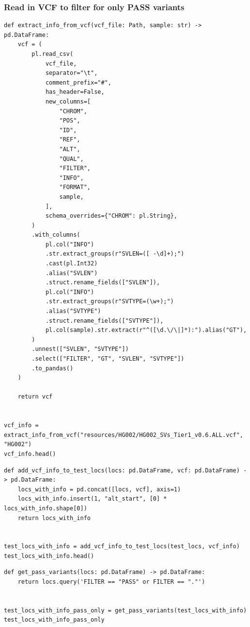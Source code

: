 \documentclass{article}
\begin{document}
\subsubsection{Read in VCF to filter for only PASS variants}

\begin{verbatim}
def extract_info_from_vcf(vcf_file: Path, sample: str) -> pd.DataFrame:
    vcf = (
        pl.read_csv(
            vcf_file,
            separator="\t",
            comment_prefix="#",
            has_header=False,
            new_columns=[
                "CHROM",
                "POS",
                "ID",
                "REF",
                "ALT",
                "QUAL",
                "FILTER",
                "INFO",
                "FORMAT",
                sample,
            ],
            schema_overrides={"CHROM": pl.String},
        )
        .with_columns(
            pl.col("INFO")
            .str.extract_groups(r"SVLEN=([ -\d]+);")
            .cast(pl.Int32)
            .alias("SVLEN")
            .struct.rename_fields(["SVLEN"]),
            pl.col("INFO")
            .str.extract_groups(r"SVTYPE=(\w+);")
            .alias("SVTYPE")
            .struct.rename_fields(["SVTYPE"]),
            pl.col(sample).str.extract(r"^([\d.\/\|]*):").alias("GT"),
        )
        .unnest(["SVLEN", "SVTYPE"])
        .select(["FILTER", "GT", "SVLEN", "SVTYPE"])
        .to_pandas()
    )

    return vcf


vcf_info = extract_info_from_vcf("resources/HG002/HG002_SVs_Tier1_v0.6.ALL.vcf", "HG002")
vcf_info.head()
\end{verbatim}

\begin{verbatim}
def add_vcf_info_to_test_locs(locs: pd.DataFrame, vcf: pd.DataFrame) -> pd.DataFrame:
    locs_with_info = pd.concat([locs, vcf], axis=1)
    locs_with_info.insert(1, "alt_start", [0] * locs_with_info.shape[0])
    return locs_with_info


test_locs_with_info = add_vcf_info_to_test_locs(test_locs, vcf_info)
test_locs_with_info.head()
\end{verbatim}

\begin{verbatim}
def get_pass_variants(locs: pd.DataFrame) -> pd.DataFrame:
    return locs.query('FILTER == "PASS" or FILTER == "."')


test_locs_with_info_pass_only = get_pass_variants(test_locs_with_info)
test_locs_with_info_pass_only
\end{verbatim}
\end{document}

